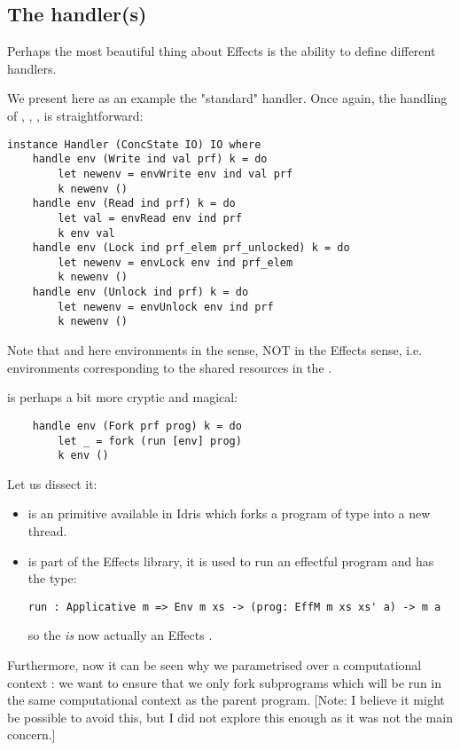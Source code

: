 \subsection{The handler(s)}

Perhaps the most beautiful thing about Effects is the ability to define
different handlers. %

We present here as an example the "standard"  handler. Once again, the
handling of , , ,  is
straightforward:

\begin{verbatim}
instance Handler (ConcState IO) IO where
    handle env (Write ind val prf) k = do
        let newenv = envWrite env ind val prf
        k newenv ()
    handle env (Read ind prf) k = do
        let val = envRead env ind prf
        k env val
    handle env (Lock ind prf_elem prf_unlocked) k = do
        let newenv = envLock env ind prf_elem
        k newenv ()
    handle env (Unlock ind prf) k = do
        let newenv = envUnlock env ind prf
        k newenv ()
\end{verbatim}

Note that  and  here environments in the 
sense, NOT in the Effects sense, i.e. environments corresponding to the shared
resources in the .

 is perhaps a bit more cryptic and magical:

\begin{verbatim}
    handle env (Fork prf prog) k = do
        let _ = fork (run [env] prog)
        k env ()
\end{verbatim}

Let us dissect it:

\begin{itemize}
    \item {} is an  primitive available in Idris which forks
        a program of type  into a new thread.
    \item {} is part of the Effects library, it is used to run an
    effectful program and has the type:
    \begin{verbatim}
run : Applicative m => Env m xs -> (prog: EffM m xs xs' a) -> m a
    \end{verbatim}
    so the \code{[env]} \emph{is} now actually an Effects .
\end{itemize}

Furthermore, now it can be seen why we parametrised  over
a computational context : we want to ensure that we only
fork  subprograms which will be run in the same computational
context as the parent  program. [Note: I believe it might be
possible to avoid this, but I did not explore this enough as it was not the
main concern.]

